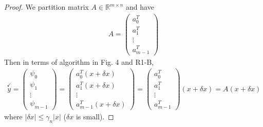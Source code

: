 \documentclass[11pt,a4paper]{article}
\begin{document}
\newpage
\setcounter{section}{24}
\section{}
\newcommand{\ycheck}{\overset{\checkmark}{y}}
\begin{proof}
    We partition matrix $A \in \mathbb{R}^{m\times n}$ and have
    \begin{align}
        A = \left(\begin{array}{c}a_0^T \\ a_1^T \\\vdots\\a_{m-1}^T \end{array}\right)
    \end{align}
    Then in terms of algorithm in Fig. 4 and R1-B, 
    \begin{align}
        \ycheck 
        = \left(\begin{array}{c}\psi_0 \\ \psi_1 \\\vdots\\\psi_{m-1} \end{array}\right) 
        = \left(\begin{array}{c}a_0^T(x+\delta x) \\ a_1^T(x+\delta x) \\\vdots\\a_{m-1}^T(x+\delta x) \end{array}\right) 
        = \left(\begin{array}{c}a_0^T \\ a_1^T \\\vdots\\a_{m-1}^T \end{array}\right) (x+\delta x)
        = A (x+\delta x)
    \end{align}
    where $|\delta x| \leq \gamma_n |x|$ ($\delta x$ is small).
\end{proof}

\setcounter{section}{26}
\section{}


\end{document}
